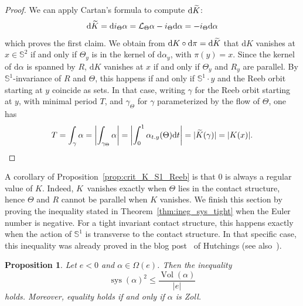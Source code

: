 \documentclass[10pt,a4paper]{amsart}
\DeclareMathOperator{\vol}{Vol}
\DeclareMathOperator{\sys}{sys}
\newcommand{\bbS}{\mathbb{S}}
\newcommand{\clL}{\mathcal{L}}
\newcommand{\rmd}{\mathrm{d}}
\let\oldtilde\tilde
\renewcommand*{\tilde}[1]{\mathchoice{\widetilde{#1}}{\widetilde{#1}}{\oldtilde{#1}}{\oldtilde{#1}}}
\newtheorem{prop}[theo]{Proposition}
\theoremstyle{definition}\newtheorem{defi}[theo]{Definition}
\begin{document}
\begin{proof}
We can apply Cartan's formula to compute $\rmd \tilde K$:
\[
\rmd \tilde K = \rmd i_{\Theta}\alpha = \clL_{\Theta} \alpha - i_{\Theta}\rmd \alpha = - i_{\Theta}\rmd \alpha
\]
which proves the first claim. We obtain from $\rmd K \circ \rmd \pi = \rmd \tilde K$ that $\rmd K$ vanishes at $x \in \bbS^2$ if and only if $\Theta_y$ is in the kernel of $\rmd \alpha_y$, with $\pi(y) = x$. Since the kernel of $\rmd \alpha$ is spanned by $R$, $\rmd K$ vanishes at $x$ if and only if $\Theta_y$ and $R_y$ are parallel. By $\bbS^1$-invariance of $R$ and $\Theta$, this happens if and only if $\bbS^1\cdot y$ and the Reeb orbit starting at $y$ coincide as sets. In that case, writing $\gamma$ for the Reeb orbit starting at $y$, with minimal period $T$, and $\gamma_\Theta$ for $\gamma$ parameterized by the flow of $\Theta$, one has
\[
T = \int_\gamma \alpha = \left| \int_{\gamma_\Theta} \alpha\right| = \left| \int_{0}^{1} \alpha_{t.y}(\Theta) \rmd t\right| = |\tilde K(\gamma)| = |K(x)|.\qedhere
\]
\end{proof}

A corollary of Proposition~\ref{prop:crit_K_S1_Reeb} is that $0$ is always a regular value of $K$. Indeed, $K$~vanishes exactly when $\Theta$ lies in the contact structure, hence $\Theta$ and $R$ cannot be parallel when $K$ vanishes. We finish this section by proving the inequality stated in Theorem~\ref{thm:ineg_sys_tight} when the Euler number is negative. For a tight invariant contact structure, this happens exactly when the action of $\bbS^1$ is transverse to the contact structure. In that specific case, this inequality was already proved in the blog post~\cite{hutchings_2013} of Hutchings (see also~\cite[Proposition~1.4]{MR4413022}).

\begin{prop}\label{prop:ineg_sys_facile}
Let $e<0$ and $\alpha \in \Omega(e)$. Then the inequality
\[
\sys(\alpha)^2 \leq \frac{\vol(\alpha)}{|e|}
\]
holds. Moreover, equality holds if and only if $\alpha$ is Zoll.
\end{prop}
\end{document}
